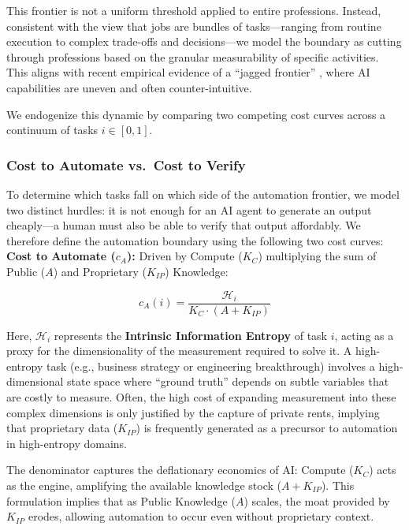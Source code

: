 \documentclass[12pt, letter]{article}
\begin{document}
This frontier is not a uniform threshold applied to entire professions. Instead, consistent with the view that jobs are bundles of tasks—ranging from routine execution to complex trade-offs and decisions—we model the boundary as cutting through professions based on the granular measurability of specific activities. This aligns with recent empirical evidence of a ``jagged frontier'' \citep{DellAcqua2023}, where AI capabilities are uneven and often counter-intuitive. 

We endogenize this dynamic by comparing two competing cost curves across a continuum of tasks $i \in [0,1]$.

\subsubsection{Cost to Automate vs.\ Cost to Verify}

To determine which tasks fall on which side of the automation frontier, we model two distinct hurdles: it is not enough for an AI agent to generate an output cheaply—a human must also be able to verify that output affordably. We therefore define the automation boundary using the following two cost curves: \\

\textbf{Cost to Automate ($c_A$):} Driven by Compute ($K_C$) multiplying the sum of Public ($A$) and Proprietary ($K_{IP}$) Knowledge:

\begin{equation}
c_A(i) = \frac{\mathcal{H}_i}{K_C \cdot (A + K_{IP})}
\end{equation}

Here, $\mathcal{H}_i$ represents the \textbf{Intrinsic Information Entropy} of task $i$, acting as a proxy for the dimensionality of the measurement required to solve it. A high-entropy task (e.g., business strategy or engineering breakthrough) involves a high-dimensional state space where ``ground truth'' depends on subtle variables that are costly to measure. Often, the high cost of expanding measurement into these complex dimensions is only justified by the capture of private rents, implying that proprietary data ($K_{IP}$) is frequently generated as a precursor to automation in high-entropy domains.

The denominator captures the deflationary economics of AI: Compute ($K_C$) acts as the engine, amplifying the available knowledge stock ($A + K_{IP}$). This formulation implies that as Public Knowledge ($A$) scales, the moat provided by $K_{IP}$ erodes, allowing automation to occur even without proprietary context. 
\end{document}
